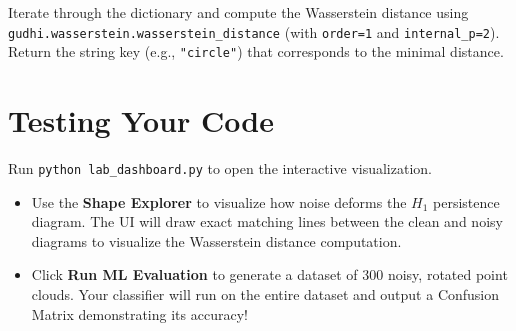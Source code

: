 \documentclass{article}
\begin{document}
Iterate through the dictionary and compute the Wasserstein distance using \texttt{gudhi.wasserstein.wasserstein\_distance} (with \texttt{order=1} and \texttt{internal\_p=2}). Return the string key (e.g., \texttt{"circle"}) that corresponds to the minimal distance.

\section*{Testing Your Code}
Run \texttt{python lab\_dashboard.py} to open the interactive visualization. 
\begin{itemize}
    \item Use the \textbf{Shape Explorer} to visualize how noise deforms the $H_1$ persistence diagram. The UI will draw exact matching lines between the clean and noisy diagrams to visualize the Wasserstein distance computation.
    \item Click \textbf{Run ML Evaluation} to generate a dataset of 300 noisy, rotated point clouds. Your classifier will run on the entire dataset and output a Confusion Matrix demonstrating its accuracy!
\end{itemize}
\end{document}
